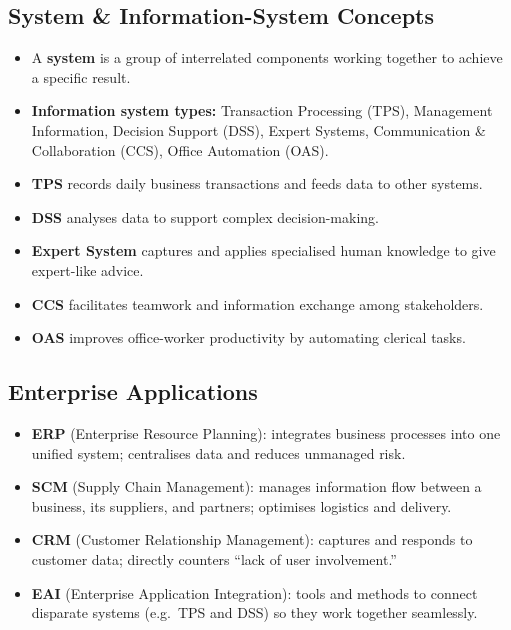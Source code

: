 \documentclass[hidelinks]{article}
\begin{document}
\subsection{System \& Information-System Concepts}
\begin{itemize}
  \item A \textbf{system} is a group of interrelated components working together to achieve a
        specific result.
  \item \textbf{Information system types:} Transaction Processing (TPS), Management Information,
        Decision Support (DSS), Expert Systems, Communication \& Collaboration (CCS),
        Office Automation (OAS).
  \item \textbf{TPS} records daily business transactions and feeds data to other systems.
  \item \textbf{DSS} analyses data to support complex decision-making.
  \item \textbf{Expert System} captures and applies specialised human knowledge to give expert-like advice.
  \item \textbf{CCS} facilitates teamwork and information exchange among stakeholders.
  \item \textbf{OAS} improves office-worker productivity by automating clerical tasks.
\end{itemize}

\subsection{Enterprise Applications}
\begin{itemize}
  \item \textbf{ERP} (Enterprise Resource Planning): integrates business processes into one
        unified system; centralises data and reduces unmanaged risk.
  \item \textbf{SCM} (Supply Chain Management): manages information flow between a business, its
        suppliers, and partners; optimises logistics and delivery.
  \item \textbf{CRM} (Customer Relationship Management): captures and responds to customer data;
        directly counters ``lack of user involvement.''
  \item \textbf{EAI} (Enterprise Application Integration): tools and methods to connect disparate
        systems (e.g.\ TPS and DSS) so they work together seamlessly.
\end{itemize}
\end{document}
